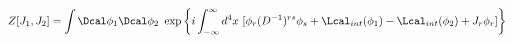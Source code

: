 \begin{equation}
  Z[J_1,J_2] = \int \Dcal \phi_1\Dcal \phi_2~\exp
  \left\{ i\int^{\infty}_{-\infty} d^4x~[\phi_r (D^{-1})^{rs} \phi_s
  + \Lcal_{int} (\phi_1)-\Lcal_{int} (\phi_2) + J_r\phi_r] \right\} \
\label{ZFT2}
\end{equation}

